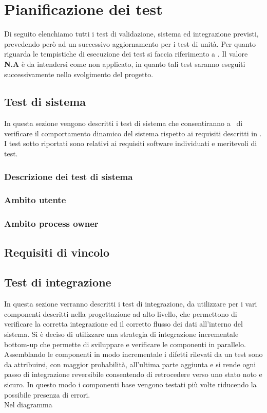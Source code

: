 \section{Pianificazione dei test}
Di seguito elenchiamo tutti i test di validazione, sistema ed integrazione previsti, prevedendo però ad un successivo aggiornamento per i test di unità. Per quanto riguarda le tempistiche di esecuzione dei test si faccia riferimento a \infoPDP.
Il valore \textbf{N.A} è da intendersi come non applicato, in quanto tali test saranno eseguiti successivamente nello svolgimento del progetto.
\subsection{Test di sistema}
In questa sezione vengono descritti i test di sistema che consentiranno a \gruppo ~di verificare il comportamento dinamico del sistema rispetto ai requisiti descritti in \infoAR. I test sotto riportati sono relativi ai requisiti software individuati e meritevoli di test.
\subsubsection{Descrizione dei test di sistema}
\subsubsection{Ambito utente}
\subsubsection{Ambito process owner}
\subsection{Requisiti di vincolo}
\subsection{Test di integrazione}
In questa sezione verranno descritti i test di integrazione, da utilizzare per i vari componenti descritti nella progettazione ad alto livello, che permettono di verificare la corretta integrazione ed il corretto flusso dei dati all’interno del sistema.
Si è deciso di utilizzare una strategia di integrazione incrementale bottom-up che permette di sviluppare e verificare le componenti in parallelo.\\
Assemblando le componenti in modo incrementale i difetti rilevati da un test sono da
attribuirsi, con maggior probabilità, all’ultima parte aggiunta e si rende ogni passo di
integrazione reversibile consentendo di retrocedere verso uno stato noto e sicuro.
In questo modo i componenti base vengono testati più volte riducendo la possibile presenza di errori.\\
Nel diagramma 
